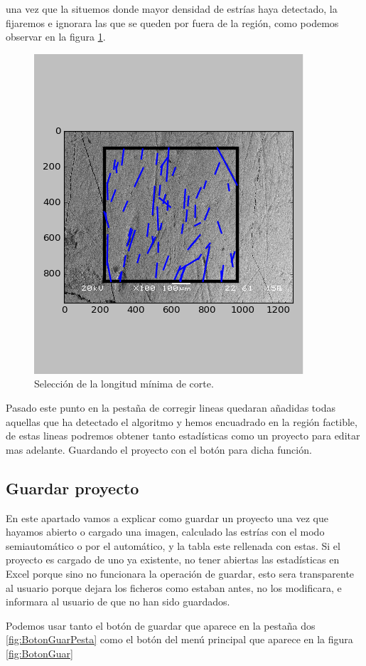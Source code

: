 \documentclass[13pt]{book}              %
\begin{document}
{una vez que la situemos donde mayor densidad de estrías haya detectado, la fijaremos e ignorara las que se queden por fuera de la región, como podemos observar en la figura \ref{fig:automati}.

\begin{figure}[h]
\centering
\includegraphics[width=.55\textwidth]{automati}
\caption{Selección de la longitud mínima de corte.}
\label{fig:automati}
\end{figure}

Pasado este punto en la pestaña de corregir lineas quedaran añadidas todas aquellas que ha detectado el algoritmo y hemos encuadrado en la región factible, de estas lineas podremos obtener tanto estadísticas como un proyecto para editar mas adelante. Guardando el proyecto con el botón para dicha función.

\subsection{Guardar proyecto}

En este apartado vamos a explicar como guardar un proyecto una vez que hayamos abierto o cargado una imagen, calculado las estrías con el modo semiautomático o por el automático, y la tabla este rellenada con estas. 
Si el proyecto es cargado de uno ya existente, no tener abiertas las estadísticas en Excel porque sino no funcionara la operación de guardar, esto sera transparente al usuario porque dejara los ficheros como estaban antes, no los modificara, e informara al usuario de que no han sido guardados. 

Podemos usar tanto el botón de guardar que aparece en la pestaña dos \ref{fig:BotonGuarPesta} como el botón del menú principal que aparece en la figura \ref{fig:BotonGuar}

}
\end{document}
